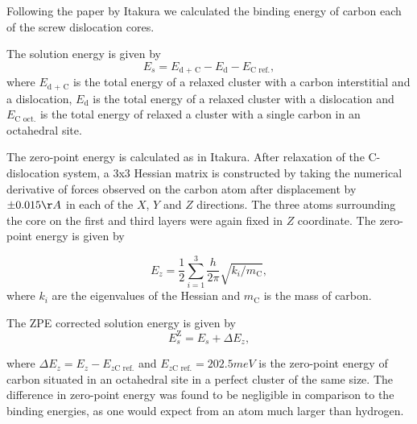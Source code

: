 \documentclass[a4paper,11pt]{article}
\begin{document}
{Following the paper by Itakura
\cite{itakura13_effec_hydrog_atoms_screw_disloc} we calculated the
binding energy of carbon each of the screw dislocation cores. 

The solution energy is given by 
\[ E_s = E_{\text{d + C}} - E_{\text{d}} - E_{\text{C ref.}}, \]
where \(E_{\text{d + C}}\) is the total energy of a relaxed cluster with a
carbon interstitial and a dislocation, \(E_{\text{d}}\) is the total
energy of a relaxed cluster with a dislocation and \(E_{\text{C
    oct.}}\) is the total energy of relaxed a cluster with a single carbon in
an octahedral site.

The zero-point energy is calculated as in Itakura. After relaxation of the
C-dislocation system, a 3x3 Hessian matrix is constructed by taking the
numerical derivative of forces observed on the carbon atom after
displacement by \(\pm 0.015 \AA\) in each of the \(X\), \(Y\) and \(Z\) directions.
The three atoms surrounding the core on the first and third layers were
again fixed in \(Z\) coordinate. The zero-point energy is
given by

\[ E_z = \frac{1}{2} \sum_{i=1}^3 \frac{h}{2\pi} \sqrt{ k_i /
    m_{\text{C}} },  \]
where \(k_i\) are the eigenvalues of the Hessian and \(m_\text{C}\) is
the mass of carbon. 

The ZPE corrected solution energy is given by 
\[ E^{\text{Z}}_{s} = E_s + \Delta E_z,  \]

where \(\Delta E_z = E_z - E_{z\text{C ref.}}\) and \(E_{z\text{C ref.}} = 202.5 meV\) is the zero-point energy of carbon
situated in an octahedral site in a perfect cluster of the same size. The difference in
zero-point energy was found to be negligible in comparison to the binding energies, as one would
expect from an atom much larger than hydrogen. 


}
\end{document}
